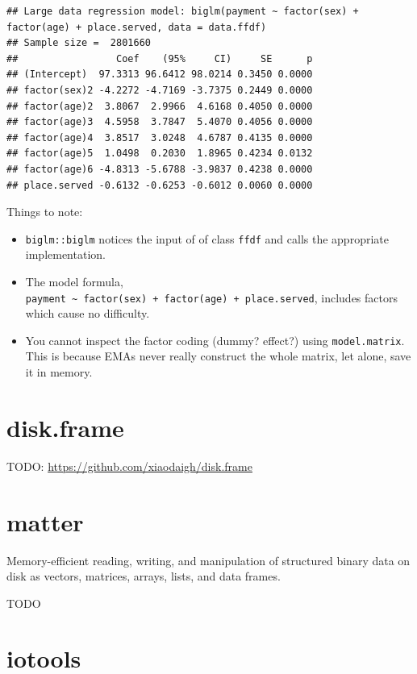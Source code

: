 \documentclass[]{book}
\providecommand{\tightlist}{%
  \setlength{\itemsep}{0pt}\setlength{\parskip}{0pt}}
\theoremstyle{definition}
\theoremstyle{definition}
\theoremstyle{definition}
\theoremstyle{remark}
\begin{document}
\begin{verbatim}
## Large data regression model: biglm(payment ~ factor(sex) + factor(age) + place.served, data = data.ffdf)
## Sample size =  2801660 
##                 Coef    (95%     CI)     SE      p
## (Intercept)  97.3313 96.6412 98.0214 0.3450 0.0000
## factor(sex)2 -4.2272 -4.7169 -3.7375 0.2449 0.0000
## factor(age)2  3.8067  2.9966  4.6168 0.4050 0.0000
## factor(age)3  4.5958  3.7847  5.4070 0.4056 0.0000
## factor(age)4  3.8517  3.0248  4.6787 0.4135 0.0000
## factor(age)5  1.0498  0.2030  1.8965 0.4234 0.0132
## factor(age)6 -4.8313 -5.6788 -3.9837 0.4238 0.0000
## place.served -0.6132 -0.6253 -0.6012 0.0060 0.0000
\end{verbatim}

Things to note:

\begin{itemize}
\tightlist
\item
  \texttt{biglm::biglm} notices the input of of class \texttt{ffdf} and calls the appropriate implementation.
\item
  The model formula, \texttt{payment\ \textasciitilde{}\ factor(sex)\ +\ factor(age)\ +\ place.served}, includes factors which cause no difficulty.
\item
  You cannot inspect the factor coding (dummy? effect?) using \texttt{model.matrix}.
  This is because EMAs never really construct the whole matrix, let alone, save it in memory.
\end{itemize}

\hypertarget{disk.frame}{%
\section{disk.frame}\label{disk.frame}}

TODO: \url{https://github.com/xiaodaigh/disk.frame}

\hypertarget{matter}{%
\section{matter}\label{matter}}

Memory-efficient reading, writing, and manipulation of structured binary data on disk as vectors, matrices, arrays, lists, and data frames.

TODO

\hypertarget{iotools}{%
\section{iotools}\label{iotools}}
\end{document}
